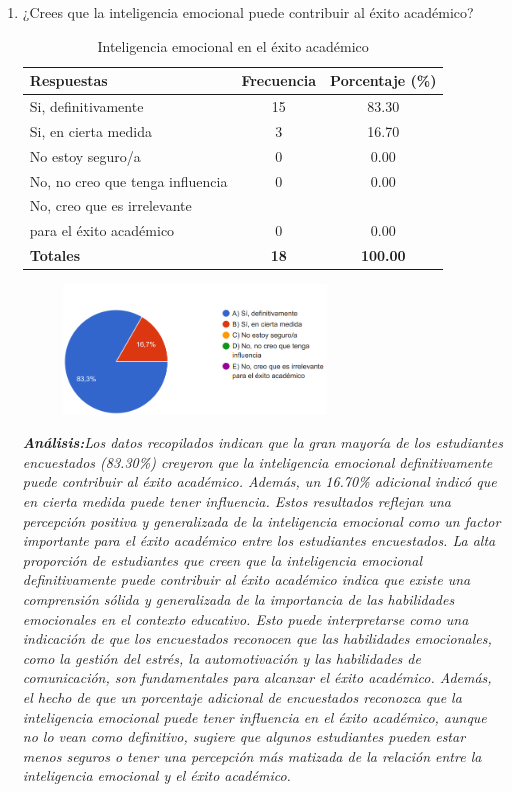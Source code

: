 \documentclass[journal]{IEEEtran}
\begin{document}
\begin{enumerate}
\item¿Crees que la inteligencia emocional puede contribuir al éxito académico?
	\begin{table}[H]
		\renewcommand{\arraystretch}{1.3}
		\centering
		\caption{Inteligencia emocional en el éxito académico}
		\begin{tabular}{ l c c }
			\hline
			\textbf{Respuestas} & \textbf{Frecuencia} & \textbf{Porcentaje (\%)}\\
			\hline
			Si, definitivamente & 15 & 83.30 \\
			Si, en cierta medida & 3 & 16.70 \\
			No estoy seguro/a & 0 & 0.00\\
			No, no creo que tenga influencia & 0 & 0.00\\
			No, creo que es irrelevante \\ para el éxito académico & 0 & 0.00\\
			\hline
			\textbf{Totales} &\textbf{18}& \textbf{100.00}\\
			\hline
		\end{tabular}
	\end{table}
	\begin{figure}[h]
		\centering
		\includegraphics[width=07cm]{Pregunta 5}
	\end{figure}
	\textit{\textbf{Análisis:}Los datos recopilados indican que la gran mayoría de los estudiantes encuestados (83.30\%) creyeron que la inteligencia emocional definitivamente puede contribuir al éxito académico. Además, un 16.70\% adicional indicó que en cierta medida puede tener influencia. Estos resultados reflejan una percepción positiva y generalizada de la inteligencia emocional como un factor importante para el éxito académico entre los estudiantes encuestados.
La alta proporción de estudiantes que creen que la inteligencia emocional definitivamente puede contribuir al éxito académico indica que existe una comprensión sólida y generalizada de la importancia de las habilidades emocionales en el contexto educativo. Esto puede interpretarse como una indicación de que los encuestados reconocen que las habilidades emocionales, como la gestión del estrés, la automotivación y las habilidades de comunicación, son fundamentales para alcanzar el éxito académico.
Además, el hecho de que un porcentaje adicional de encuestados reconozca que la inteligencia emocional puede tener influencia en el éxito académico, aunque no lo vean como definitivo, sugiere que algunos estudiantes pueden estar menos seguros o tener una percepción más matizada de la relación entre la inteligencia emocional y el éxito académico.
}\\


\end{enumerate}
\end{document}
